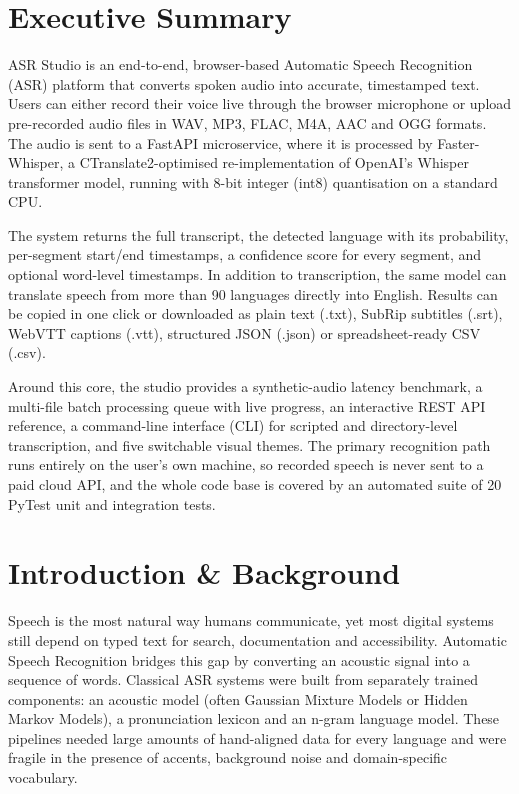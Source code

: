 \documentclass[11pt,a4paper]{article}
\begin{document}
\clearpage
\section{Executive Summary}
ASR Studio is an end-to-end, browser-based Automatic Speech Recognition (ASR) platform that converts spoken audio into accurate, timestamped text. Users can either record their voice live through the browser microphone or upload pre-recorded audio files in WAV, MP3, FLAC, M4A, AAC and OGG formats. The audio is sent to a FastAPI microservice, where it is processed by Faster-Whisper, a CTranslate2-optimised re-implementation of OpenAI's Whisper transformer model, running with 8-bit integer (int8) quantisation on a standard CPU.

The system returns the full transcript, the detected language with its probability, per-segment start/end timestamps, a confidence score for every segment, and optional word-level timestamps. In addition to transcription, the same model can translate speech from more than 90 languages directly into English. Results can be copied in one click or downloaded as plain text (.txt), SubRip subtitles (.srt), WebVTT captions (.vtt), structured JSON (.json) or spreadsheet-ready CSV (.csv).

Around this core, the studio provides a synthetic-audio latency benchmark, a multi-file batch processing queue with live progress, an interactive REST API reference, a command-line interface (CLI) for scripted and directory-level transcription, and five switchable visual themes. The primary recognition path runs entirely on the user's own machine, so recorded speech is never sent to a paid cloud API, and the whole code base is covered by an automated suite of 20 PyTest unit and integration tests.

\section{Introduction \& Background}
Speech is the most natural way humans communicate, yet most digital systems still depend on typed text for search, documentation and accessibility. Automatic Speech Recognition bridges this gap by converting an acoustic signal into a sequence of words. Classical ASR systems were built from separately trained components: an acoustic model (often Gaussian Mixture Models or Hidden Markov Models), a pronunciation lexicon and an n-gram language model. These pipelines needed large amounts of hand-aligned data for every language and were fragile in the presence of accents, background noise and domain-specific vocabulary.
\end{document}
